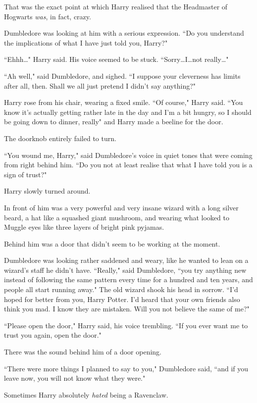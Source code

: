 That was the exact point at which Harry realised that the Headmaster of Hogwarts \emph{was}, in fact, crazy.

Dumbledore was looking at him with a serious expression. ``Do you understand the implications of what I have just told you, Harry?"

``Ehhh…" Harry said. His voice seemed to be stuck. ``Sorry…I…not really…"

``Ah well," said Dumbledore, and sighed. ``I suppose your cleverness has limits after all, then. Shall we all just pretend I didn't say anything?"

Harry rose from his chair, wearing a fixed smile. ``Of course," Harry said. ``You know it's actually getting rather late in the day and I'm a bit hungry, so I should be going down to dinner, really" and Harry made a beeline for the door.

The doorknob entirely failed to turn.

``You wound me, Harry," said Dumbledore's voice in quiet tones that were coming from right behind him. ``Do you not at least realise that what I have told you is a sign of trust?"

Harry slowly turned around.

In front of him was a very powerful and very insane wizard with a long silver beard, a hat like a squashed giant mushroom, and wearing what looked to Muggle eyes like three layers of bright pink pyjamas.

Behind him was a door that didn't seem to be working at the moment.

Dumbledore was looking rather saddened and weary, like he wanted to lean on a wizard's staff he didn't have. ``Really," said Dumbledore, ``you try anything new instead of following the same pattern every time for a hundred and ten years, and people all start running away." The old wizard shook his head in sorrow. ``I'd hoped for better from you, Harry Potter. I'd heard that your own friends also think you mad. I know they are mistaken. Will you not believe the same of me?"

``Please open the door," Harry said, his voice trembling. ``If you ever want me to trust you again, open the door."

There was the sound behind him of a door opening.

``There were more things I planned to say to you," Dumbledore said, ``and if you leave now, you will not know what they were."

Sometimes Harry absolutely \emph{hated} being a Ravenclaw.

